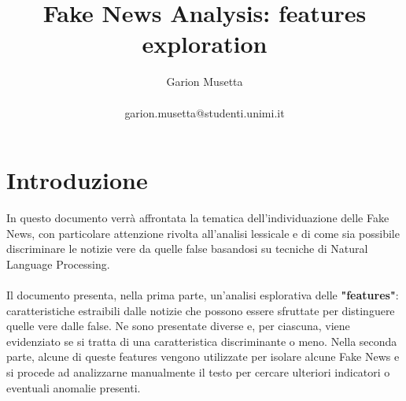 \documentclass{article}
\title{\textbf{Fake News Analysis: features exploration}}
\author{Garion Musetta\\~\\garion.musetta@studenti.unimi.it}
\begin{document}
	\maketitle   
	 
   	\section{Introduzione}
    	In questo documento verrà affrontata la tematica dell'individuazione delle Fake News, con particolare attenzione rivolta all'analisi lessicale e di come sia possibile discriminare le notizie vere da quelle false basandosi su tecniche di Natural Language Processing.
	    \\~\\
	    Il documento presenta, nella prima parte, un'analisi esplorativa delle \textbf{"features"}: caratteristiche estraibili dalle notizie che possono essere sfruttate per distinguere quelle vere dalle false. Ne sono presentate diverse e, per ciascuna, viene evidenziato se si tratta di una caratteristica discriminante o meno.
	    Nella seconda parte, alcune di queste features vengono utilizzate per isolare alcune Fake News e si procede ad analizzarne manualmente il testo per cercare ulteriori indicatori o eventuali anomalie presenti.
	    
	    \newpage
	    
\end{document}
